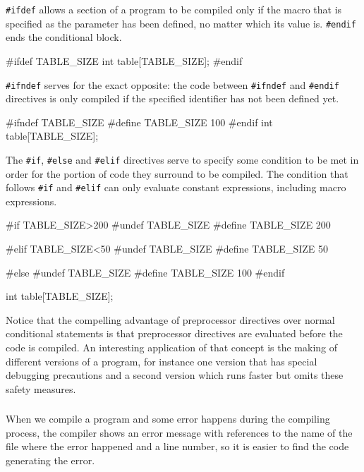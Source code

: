\documentclass[10pt,a4paper]{scrartcl}
\begin{document}
\begin{multicols*}{2}
\verb+#ifdef+ allows a section of a program to be compiled only if the macro that is specified as the parameter has been defined, no matter which its value is. \verb+#endif+ ends the conditional block.

\begin{TPCpp}
#ifdef TABLE_SIZE
int table[TABLE_SIZE];
#endif
\end{TPCpp}

\verb+#ifndef+ serves for the exact opposite: the code between \verb+#ifndef+ and \verb+#endif+ directives is only compiled if the specified identifier has not been defined yet.

\begin{TPCpp}
#ifndef TABLE_SIZE
#define TABLE_SIZE 100
#endif
int table[TABLE_SIZE];
\end{TPCpp}

The \verb+#if+, \verb+#else+ and \verb+#elif+ directives serve to specify some condition to be met in order for the portion of code they surround to be compiled. The condition that follows \verb+#if+ and \verb+#elif+ can only evaluate constant expressions, including macro expressions.

\begin{TPCpp}
#if TABLE_SIZE>200
#undef TABLE_SIZE
#define TABLE_SIZE 200

#elif TABLE_SIZE<50
#undef TABLE_SIZE
#define TABLE_SIZE 50

#else
#undef TABLE_SIZE
#define TABLE_SIZE 100
#endif

int table[TABLE_SIZE];
\end{TPCpp}

Notice that the compelling advantage of preprocessor directives over normal conditional statements is that preprocessor directives are evaluated before the code is compiled. An interesting application of that concept is the making of different versions of a program, for instance one version that has special debugging precautions and a second version which runs faster but omits these safety measures.

\subsubsection{}

 When we compile a program and some error happens during the compiling process, the compiler shows an error message with references to the name of the file where the error happened and a line number, so it is easier to find the code generating the error.


\end{multicols*}
\end{document}
